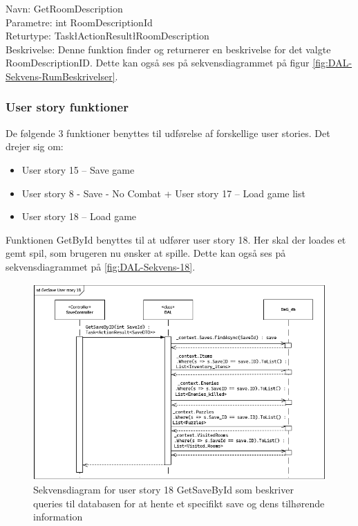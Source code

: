Navn: GetRoomDescription \\
Parametre: int RoomDescriptionId \\
Returtype: Task\l ActionResult\l RoomDescription\g\g\\
Beskrivelse: Denne funktion finder og returnerer en beskrivelse for det valgte RoomDescriptionID. 
Dette kan også ses på sekvensdiagrammet på figur \autoref{fig:DAL-Sekvens-RumBeskrivelser}.


\subsubsection{User story funktioner}
De følgende 3 funktioner benyttes til udførelse af forskellige user stories.
Det drejer sig om:
\begin{itemize}
\item User story 15 – Save game
\item User story 8 - Save - No Combat  + User story 17 – Load game list 
\item User story 18 – Load game \\
\end{itemize}

Funktionen GetById benyttes til at udfører user story 18.
Her skal der loades et gemt spil, som brugeren nu ønsker at spille. 
Dette kan også ses på sekvensdiagrammet på \autoref{fig:DAL-Sekvens-18}.\\

\begin{figure}[H]
\centering
\includegraphics[width = \textwidth]{02-Body/Images/DAL-Database/GetSavesByIdSd.PNG}
\caption{Sekvensdiagram for user story 18 GetSaveById som beskriver queries til databasen for at hente et specifikt save og dens tilhørende information}
\label{fig:DAL-Sekvens-18}
\end{figure}

